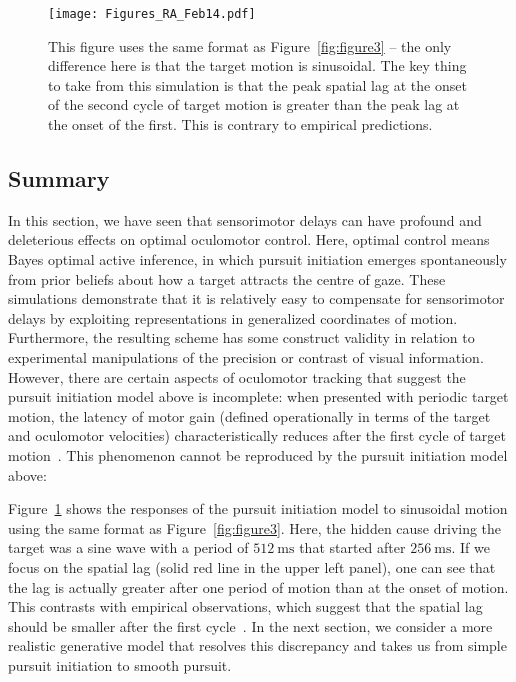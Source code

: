 \documentclass[a4paper]{article} %
\newcommand{\ms}{\si{\milli\second}}%
\begin{document}
\begin{figure}%
 \centerline{%
 \texttt{[image: Figures\_RA\_Feb14.pdf]} %
}%
\caption{This figure uses the same format as Figure~\ref{fig:figure3} -- the
only difference here is that the target motion is sinusoidal. The key
thing to take from this simulation is that the peak spatial lag at the
onset of the second cycle of target motion is greater than the peak lag
at the onset of the first. This is contrary to empirical predictions.}%
\label{fig:figure6}
\end{figure}

\subsection{Summary}

In this section, we have seen that sensorimotor delays can have profound
and deleterious effects on optimal oculomotor control. Here, optimal
control means Bayes optimal active inference, in which pursuit
initiation emerges spontaneously from prior beliefs about how a target
attracts the centre of gaze. These simulations demonstrate that it is
relatively easy to compensate for sensorimotor delays by exploiting
representations in generalized coordinates of motion. Furthermore, the
resulting scheme has some construct validity in relation to experimental
manipulations of the precision or contrast of visual information.
However, there are certain aspects of oculomotor tracking that suggest
the pursuit initiation model above is incomplete: when presented with
periodic target motion, the latency of motor gain (defined operationally
in terms of the target and oculomotor velocities) characteristically
reduces after the first cycle of target motion~\citep{Barnes00}.
This phenomenon cannot be reproduced by the pursuit initiation model
above:

Figure~\ref{fig:figure6} shows the responses of the pursuit initiation model to
sinusoidal motion using the same format as Figure~\ref{fig:figure3}. Here, the hidden
cause driving the target was a sine wave with a period of $512~\ms$ that started after $256~\ms$. If we focus on the
spatial lag (solid red line in the upper left panel), one can see that
the lag is actually greater after one period of motion than at the onset
of motion. This contrasts with empirical observations, which suggest
that the spatial lag should be smaller after the first cycle~\citep{Barnes00}. In the next section, we consider a more realistic generative
model that resolves this discrepancy and takes us from simple pursuit
initiation to smooth pursuit.
\end{document}
